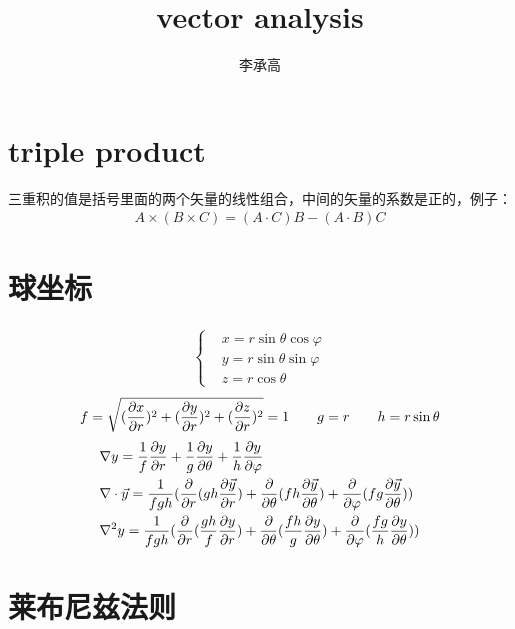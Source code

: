 \documentclass[UTF8]{article}
\title{vector analysis}
\author{李承高}
\numberwithin{equation}{section}
\begin{document}
\maketitle
\thispagestyle{empty}
\newpage
\thispagestyle{empty}
\tableofcontents
\newpage

\section{triple product}
三重积的值是括号里面的两个矢量的线性组合，中间的矢量的系数是正的，例子：
\begin{align*}
    A\times (B\times C) = (A\cdot C)B-(A\cdot B)C
\end{align*}
\section{球坐标}
\begin{align*}
    \begin{cases}
    &x=r\sin\theta \cos \varphi\\
    &y=r\sin\theta \sin \varphi\\
    &z=r\cos \theta
\end{cases}
\end{align*}
\begin{align*}
    f = \sqrt{(\pdv{x}{r})^2+(\pdv{y}{r})^2+(\pdv{z}{r})^2}=1\qquad g=r\qquad h=r\sin\theta
\end{align*}
\begin{align*}
    &\nabla y = \frac{1}{f}\pdv{y}{r}+\frac{1}{g}\pdv{y}{\theta}+\frac{1}{h}\pdv{y}{\varphi}     \\
    &\nabla \cdot \vec{y}= \frac{1}{fgh}(\frac{\partial}{\partial r} (gh\pdv{\vec{y}}{r})
    +\frac{\partial}{\partial \theta}(fh\pdv{\vec{y}}{\theta})+\frac{\partial}{\partial \varphi}(fg\pdv{\vec{y}}{\theta}))\\
    &\nabla^2 y = \frac{1}{fgh}(\frac{\partial}{\partial r} (\frac{gh}{f}\pdv{y}{r})
    +\frac{\partial}{\partial \theta}(\frac{fh}{g}\pdv{y}{\theta})+\frac{\partial}{\partial \varphi}(\frac{fg}{h}\pdv{y}{\theta}))
\end{align*}
\section*{莱布尼兹法则}
\end{document}
